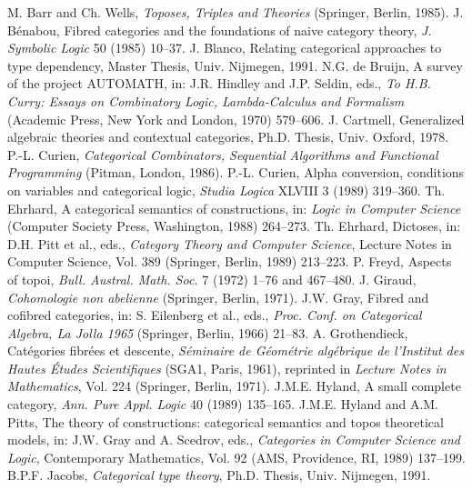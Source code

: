 \documentclass{article}
\begin{document}
\begin{thebibliography}{99}
 M. Barr and Ch. Wells, \emph{Toposes, Triples and Theories} (Springer, Berlin, 1985).
 J. Bénabou, Fibred categories and the foundations of naive category theory, \emph{J. Symbolic Logic} 50 (1985) 10--37.
 J. Blanco, Relating categorical approaches to type dependency, Master Thesis, Univ. Nijmegen, 1991.
 N.G. de Bruijn, A survey of the project AUTOMATH, in: J.R. Hindley and J.P. Seldin, eds., \emph{To H.B. Curry: Essays on Combinatory Logic, Lambda-Calculus and Formalism} (Academic Press, New York and London, 1970) 579--606.
 J. Cartmell, Generalized algebraic theories and contextual categories, Ph.D. Thesis, Univ. Oxford, 1978.
 P.-L. Curien, \emph{Categorical Combinators, Sequential Algorithms and Functional Programming} (Pitman, London, 1986).
 P.-L. Curien, Alpha conversion, conditions on variables and categorical logic, \emph{Studia Logica} XLVIII 3 (1989) 319--360.
 Th. Ehrhard, A categorical semantics of constructions, in: \emph{Logic in Computer Science} (Computer Society Press, Washington, 1988) 264--273.
 Th. Ehrhard, Dictoses, in: D.H. Pitt et al., eds., \emph{Category Theory and Computer Science}, Lecture Notes in Computer Science, Vol. 389 (Springer, Berlin, 1989) 213--223.
 P. Freyd, Aspects of topoi, \emph{Bull. Austral. Math. Soc.} 7 (1972) 1--76 and 467--480.
 J. Giraud, \emph{Cohomologie non abelienne} (Springer, Berlin, 1971).
 J.W. Gray, Fibred and cofibred categories, in: S. Eilenberg et al., eds., \emph{Proc. Conf. on Categorical Algebra, La Jolla 1965} (Springer, Berlin, 1966) 21--83.
 A. Grothendieck, Catégories fibrées et descente, \emph{Séminaire de Géométrie algébrique de l’Institut des Hautes Études Scientifiques} (SGA1, Paris, 1961), reprinted in \emph{Lecture Notes in Mathematics}, Vol. 224 (Springer, Berlin, 1971).
 J.M.E. Hyland, A small complete category, \emph{Ann. Pure Appl. Logic} 40 (1989) 135--165.
 J.M.E. Hyland and A.M. Pitts, The theory of constructions: categorical semantics and topos theoretical models, in: J.W. Gray and A. Scedrov, eds., \emph{Categories in Computer Science and Logic}, Contemporary Mathematics, Vol. 92 (AMS, Providence, RI, 1989) 137--199.
 B.P.F. Jacobs, \emph{Categorical type theory}, Ph.D. Thesis, Univ. Nijmegen, 1991.

\end{thebibliography}
\end{document}
